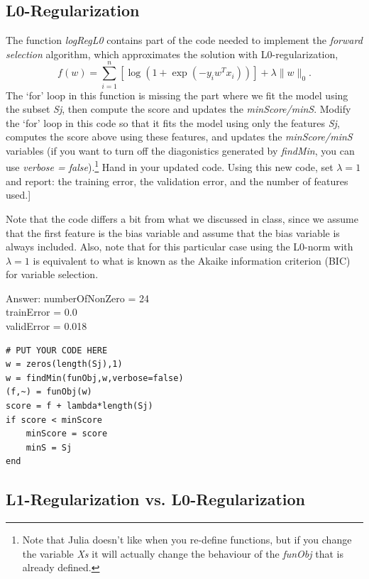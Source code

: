 \documentclass{article}
\def\ans#1{\par\gre{Answer: #1}}
\def\blu#1{{\color{blu}#1}}
\def\gre#1{{\color{gre}#1}}
\def\norm#1{\|#1\|}
\begin{document}
\pagebreak

\subsection{L0-Regularization}

The function \emph{logRegL0} contains part of the code needed to implement the \emph{forward selection} algorithm, which approximates the solution with L0-regularization,
\[
f(w) =  \sum_{i=1}^n \left[\log(1+\exp(-y_iw^Tx_i))\right] + \lambda\norm{w}_0.
\]
The `for' loop in this function is missing the part where we fit the model using the subset \emph{Sj}, then compute the score and updates the \emph{minScore/minS}. Modify the `for' loop in this code so that it fits the model using only the features \emph{Sj}, computes the score above using these features, and updates the \emph{minScore/minS} variables (if you want to turn off the diagonistics generated by \emph{findMin}, you can use \emph{verbose = false}).\footnote{Note that Julia doesn't like when you re-define functions, but if you change the variable \emph{Xs} it will actually change the behaviour of the \emph{funObj} that is already defined.}
\blu{Hand in your updated code. Using this new code, set $\lambda = 1$ and report: the training error, the validation error, and the number of features used.}]

Note that the code differs a bit from what we discussed in class, since we assume that the first feature is the bias variable and assume that the bias variable is always included. Also, note that for this particular case using the L0-norm with $\lambda=1$ is equivalent to what is known as the Akaike information criterion (BIC) for variable selection.

\ans{numberOfNonZero = 24\\
trainError = 0.0\\
validError = 0.018\\}

\begin{lstlisting}
# PUT YOUR CODE HERE
w = zeros(length(Sj),1)
w = findMin(funObj,w,verbose=false)
(f,~) = funObj(w)
score = f + lambda*length(Sj)
if score < minScore
	minScore = score
	minS = Sj
end
\end{lstlisting}


\pagebreak

\subsection{L1-Regularization vs. L0-Regularization}
\end{document}
